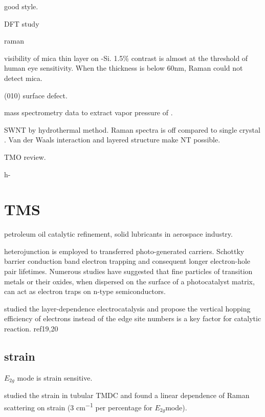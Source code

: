  good style. \cite{Siciliano2009} \cite{Abdellaoui1997}

  DFT study \cite{B511044K} \cite{Cora1997} \cite{Sayede2005}

 raman \cite{Lee2002}

visibility of mica thin layer on -Si. \cite{Castellanos-gomez2011} 1.5\% contrast is almost at the threshold of human eye sensitivity.  When the thickness is below 60nm, Raman could not detect mica.

 (010) surface defect. \cite{Chen2001}

mass spectrometry data to extract vapor pressure of .

 SWNT by hydrothermal method.\cite{Hu2008a} Raman spectra is off compared to single crystal .  Van der Waals interaction and layered structure make NT possible.

TMO review.\cite{Goodenough2013}

h- \cite{Lunk2010} \cite{Zheng2009}



\section{TMS}

petroleum oil catalytic refinement, solid lubricants in aerospace industry.

heterojunction is employed to transferred photo-generated carriers. Schottky barrier conduction band electron trapping and consequent longer electron-hole pair lifetimes. Numerous studies have suggested that fine particles of transition metals or their oxides, when dispersed on the surface of a photocatalyst matrix, can act as electron traps on n-type semiconductors.\cite{Zhou2010} 


\citeauthor{Cao2014} studied the layer-dependence  electrocatalysis and propose the vertical hopping efficiency of electrons instead of the edge site numbers is a key factor for catalytic reaction.\cite{Cao2014} ref19,20


\subsection{strain}

$E_{2g}$ mode is strain sensitive. 

\citeauthor{Ghorbani-Asl2013} studied the strain in tubular TMDC and found a linear dependence of Raman scattering on strain (3 \si{cm^{-1}} per percentage for $E_{2g}$mode).\cite{Ghorbani-Asl2013} 

